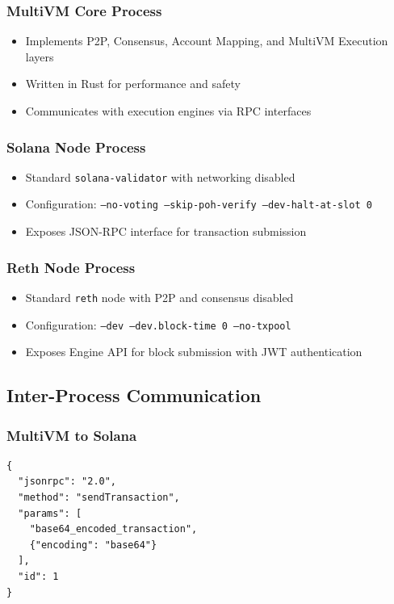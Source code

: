 \documentclass[11pt,a4paper]{article}
\begin{document}
\subsubsection{MultiVM Core Process}
\begin{itemize}
    \item Implements P2P, Consensus, Account Mapping, and MultiVM Execution layers
    \item Written in Rust for performance and safety
    \item Communicates with execution engines via RPC interfaces
\end{itemize}

\subsubsection{Solana Node Process}
\begin{itemize}
    \item Standard \texttt{solana-validator} with networking disabled
    \item Configuration: \texttt{--no-voting --skip-poh-verify --dev-halt-at-slot 0}
    \item Exposes JSON-RPC interface for transaction submission
\end{itemize}

\subsubsection{Reth Node Process}
\begin{itemize}
    \item Standard \texttt{reth} node with P2P and consensus disabled
    \item Configuration: \texttt{--dev --dev.block-time 0 --no-txpool}
    \item Exposes Engine API for block submission with JWT authentication
\end{itemize}

\subsection{Inter-Process Communication}

\subsubsection{MultiVM to Solana}
\begin{lstlisting}
{
  "jsonrpc": "2.0",
  "method": "sendTransaction",
  "params": [
    "base64_encoded_transaction",
    {"encoding": "base64"}
  ],
  "id": 1
}
\end{lstlisting}
\end{document}
